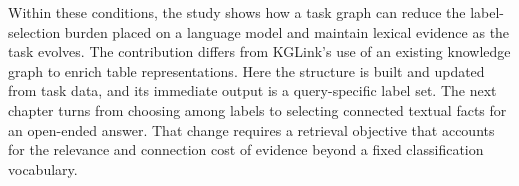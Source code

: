Within these conditions, the study shows how a task graph can reduce the label-selection burden placed on a language model and maintain lexical evidence as the task evolves. The contribution differs from KGLink's use of an existing knowledge graph to enrich table representations. Here the structure is built and updated from task data, and its immediate output is a query-specific label set. The next chapter turns from choosing among labels to selecting connected textual facts for an open-ended answer. That change requires a retrieval objective that accounts for the relevance and connection cost of evidence beyond a fixed classification vocabulary.
